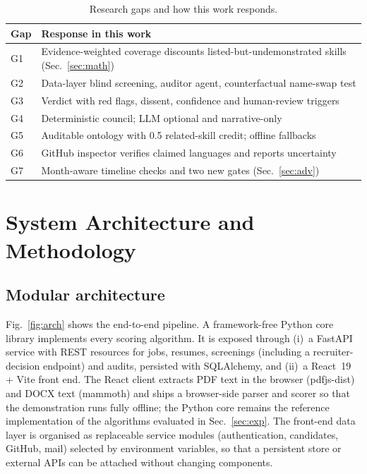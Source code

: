 \documentclass[conference]{IEEEtran}
\begin{document}
\begin{table}[t]
\caption{Research gaps and how this work responds.}
\label{tab:gaps}
\centering
\footnotesize
\renewcommand{\arraystretch}{1.1}
\begin{tabular}{@{}lp{6.1cm}@{}}
\toprule
Gap & Response in this work \\
\midrule
G1 & Evidence-weighted coverage discounts listed-but-undemonstrated skills (Sec.~\ref{sec:math}) \\
G2 & Data-layer blind screening, auditor agent, counterfactual name-swap test \\
G3 & Verdict with red flags, dissent, confidence and human-review triggers \\
G4 & Deterministic council; LLM optional and narrative-only \\
G5 & Auditable ontology with 0.5 related-skill credit; offline fallbacks \\
G6 & GitHub inspector verifies claimed languages and reports uncertainty \\
G7 & Month-aware timeline checks and two new gates (Sec.~\ref{sec:adv}) \\
\bottomrule
\end{tabular}
\end{table}

\section{System Architecture and Methodology}
\label{sec:arch}

\subsection{Modular architecture}
Fig.~\ref{fig:arch} shows the end-to-end pipeline. A framework-free Python core library implements every scoring algorithm. It is exposed through (i)~a FastAPI service with REST resources for jobs, resumes, screenings (including a recruiter-decision endpoint) and audits, persisted with SQLAlchemy, and (ii)~a React~19 + Vite front end. The React client extracts PDF text in the browser (pdfjs-dist) and DOCX text (mammoth) and ships a browser-side parser and scorer so that the demonstration runs fully offline; the Python core remains the reference implementation of the algorithms evaluated in Sec.~\ref{sec:exp}. The front-end data layer is organised as replaceable service modules (authentication, candidates, GitHub, mail) selected by environment variables, so that a persistent store or external APIs can be attached without changing components.
\end{document}
